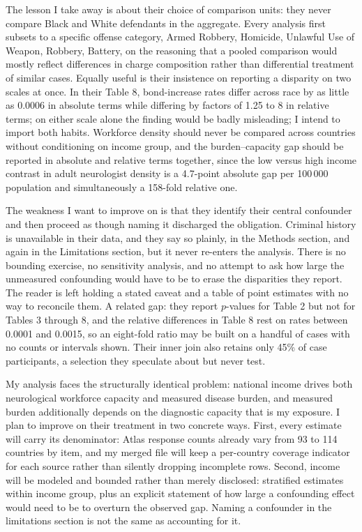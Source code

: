 \documentclass[12pt]{article}
\begin{document}
The lesson I take away is about their choice of comparison units: they never compare
Black and White defendants in the aggregate. Every analysis first subsets to a
specific offense category, Armed Robbery, Homicide, Unlawful Use of Weapon,
Robbery, Battery, on the reasoning that a pooled comparison would mostly reflect
differences in charge composition rather than differential treatment of similar
cases. Equally useful is their insistence on reporting a disparity on two scales
at once. In their Table 8, bond-increase rates differ across race by as little as
0.0006 in absolute terms while differing by factors of 1.25 to 8 in relative
terms; on either scale alone the finding would be badly misleading; I intend to
import both habits. Workforce density should never be compared across countries
without conditioning on income group, and the burden--capacity gap should be
reported in absolute and relative terms together, since the low versus
high income contrast in adult neurologist density is a 4.7-point absolute gap per
100\,000 population and simultaneously a 158-fold relative one.
 
The weakness I want to improve on is that they identify their central confounder
and then proceed as though naming it discharged the obligation. Criminal history
is unavailable in their data, and they say so plainly, in the Methods section,
and again in the Limitations section, but it never re-enters the analysis. There
is no bounding exercise, no sensitivity analysis, and no attempt to ask how large
the unmeasured confounding would have to be to erase the disparities they report.
The reader is left holding a stated caveat and a table of point estimates with no
way to reconcile them. A related gap: they report $p$-values for Table 2 but not
for Tables 3 through 8, and the relative differences in Table 8 rest on rates
between 0.0001 and 0.0015, so an eight-fold ratio may be built on a handful of
cases with no counts or intervals shown. Their inner join also retains only 45\%
of case participants, a selection they speculate about but never test.
 
My analysis faces the structurally identical problem: national income drives both
neurological workforce capacity and measured disease burden, and measured burden
additionally depends on the diagnostic capacity that is my exposure. I plan to
improve on their treatment in two concrete ways. First, every estimate will carry
its denominator: Atlas response counts already vary from 93 to 114 countries by
item, and my merged file will keep a per-country coverage indicator for each
source rather than silently dropping incomplete rows. Second, income will be
modeled and bounded rather than merely disclosed: stratified estimates within
income group, plus an explicit statement of how large a confounding effect would
need to be to overturn the observed gap. Naming a confounder in the limitations
section is not the same as accounting for it.
\end{document}
